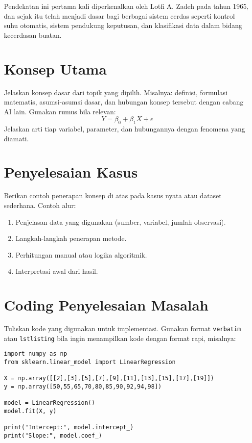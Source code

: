 \documentclass[12pt,a4paper]{article}
\theoremstyle{remark}
\begin{document}
Pendekatan ini pertama kali diperkenalkan oleh Lotfi A. Zadeh pada tahun 1965, 
dan sejak itu telah menjadi dasar bagi berbagai sistem cerdas 
seperti kontrol suhu otomatis, sistem pendukung keputusan, dan klasifikasi data 
dalam bidang kecerdasan buatan.


\section{Konsep Utama}
Jelaskan konsep dasar dari topik yang dipilih.  
Misalnya: definisi, formulasi matematis, asumsi-asumsi dasar, dan hubungan konsep tersebut dengan cabang AI lain.  
Gunakan rumus bila relevan:
\[
    Y = \beta_0 + \beta_1 X + \epsilon
\]
Jelaskan arti tiap variabel, parameter, dan hubungannya dengan fenomena yang diamati.

\section{Penyelesaian Kasus}
Berikan contoh penerapan konsep di atas pada kasus nyata atau dataset sederhana.  
Contoh alur:
\begin{enumerate}
    \item Penjelasan data yang digunakan (sumber, variabel, jumlah observasi).
    \item Langkah-langkah penerapan metode.
    \item Perhitungan manual atau logika algoritmik.
    \item Interpretasi awal dari hasil.
\end{enumerate}

\section{Coding Penyelesaian Masalah}
Tuliskan kode yang digunakan untuk implementasi.  
Gunakan format \texttt{verbatim} atau \texttt{lstlisting} bila ingin menampilkan kode dengan format rapi, misalnya:

\begin{verbatim}
import numpy as np
from sklearn.linear_model import LinearRegression

X = np.array([[2],[3],[5],[7],[9],[11],[13],[15],[17],[19]])
y = np.array([50,55,65,70,80,85,90,92,94,98])

model = LinearRegression()
model.fit(X, y)

print("Intercept:", model.intercept_)
print("Slope:", model.coef_)
\end{verbatim}
\end{document}
